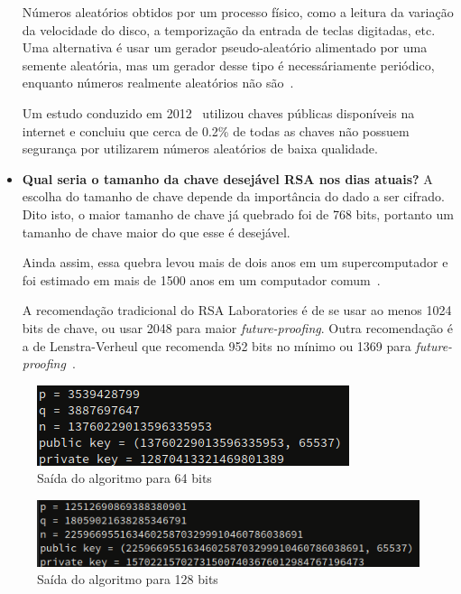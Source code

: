 \documentclass[12pt]{article}
\begin{document}
\begin{itemize}
        Números aleatórios obtidos por um processo físico, como a leitura da
        variação da velocidade do disco, a temporização da entrada de teclas
        digitadas, etc. Uma alternativa é usar um gerador pseudo-aleatório
        alimentado por uma semente aleatória, mas um gerador desse tipo é
        necessáriamente periódico, enquanto números realmente aleatórios não
        são~\cite{rsa:09:1}.

        Um estudo conduzido em 2012~\cite{lenstra:12} utilizou chaves públicas
        disponíveis na internet e concluiu que cerca de 0.2\% de todas as
        chaves não possuem segurança por utilizarem números aleatórios de baixa
        qualidade.
        \newline
    \item \textbf{Qual seria o tamanho da chave desejável RSA nos dias atuais?}
        A escolha do tamanho de chave depende da importância do dado a ser
        cifrado. Dito isto, o maior tamanho de chave já quebrado foi de 768
        bits, portanto um tamanho de chave maior do que esse é desejável.

        Ainda assim, essa quebra levou mais de dois anos em um supercomputador
        e foi estimado em mais de 1500 anos em um computador
        comum~\cite{timmer:10}.

        A recomendação tradicional do RSA Laboratories é de se usar ao menos
        1024 bits de chave, ou usar 2048 para maior \textit{future-proofing}.
        Outra recomendação é a de Lenstra-Verheul que recomenda 952 bits no
        mínimo ou 1369 para \textit{future-proofing}~\cite{rsa:09:2}.
\end{itemize}




\begin{figure}[ht]
    \centering
    \includegraphics{rsa_64.png}
    \caption{Saída do algoritmo para 64 bits}
    \label{fig:rsa_64}
\end{figure}

\begin{figure}[ht]
    \centering
    \includegraphics[width=\textwidth]{rsa_128.png}
    \caption{Saída do algoritmo para 128 bits}
    \label{fig:rsa_128}
\end{figure}
\end{document}
